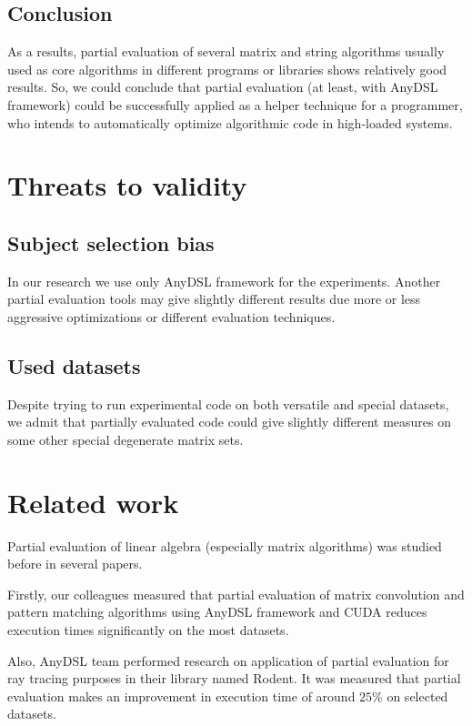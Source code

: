 \documentclass[conference]{IEEEtran}
\begin{document}
\subsection{Conclusion}
As a results, partial evaluation of several matrix and string algorithms usually used as core algorithms in different programs or libraries shows relatively good results. So, we could conclude that partial evaluation (at least, with AnyDSL framework) could be successfully applied as a helper technique for a programmer, who intends to automatically optimize algorithmic code in high-loaded systems.


\section{Threats to validity}

\subsection{Subject selection bias}
In our research we use only AnyDSL framework for the experiments. Another partial evaluation tools may give slightly different results due more or less aggressive optimizations or different evaluation techniques.

\subsection{Used datasets}
Despite trying to run experimental code on both versatile and special datasets, we admit that partially evaluated code could give slightly different measures on some other special degenerate matrix sets.

\section{Related work}

Partial evaluation of linear algebra (especially matrix algorithms) was studied before in several papers.

Firstly, our colleagues measured \cite{tyurin2020optimizing} that partial evaluation of matrix convolution and pattern matching algorithms using AnyDSL framework and CUDA reduces execution times significantly on the most datasets.

Also, AnyDSL team performed research \cite{perard2019rodent} on application of partial evaluation for ray tracing purposes in their library named Rodent. It was measured that partial evaluation  makes an improvement in execution time of around $25\%$ on selected datasets.
\end{document}
